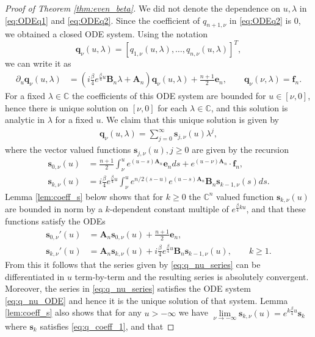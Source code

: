 \documentclass[10pt,a4paper]{amsart}
\newcommand{\CC}{{\mathbb C}}
\begin{document}
\begin{proof}[Proof of Theorem \ref{thm:even_beta}]
We did not denote the dependence on $u,\lambda$ in \eqref{eq:ODEq1} and \eqref{eq:ODEq2}. 
Since the coefficient 
of $q_{n+1,\nu}$ in \eqref{eq:ODEq2} is 0,   we obtained a closed ODE system.
Using the notation
\[
\mathbf{q}_{\nu}(u,\lambda)=[q_{1,\nu}(u,\lambda), \dots, q_{n,\nu}(u,\lambda)]^T,
\]
we can write it as 
\begin{align}\label{eq:q_nu_ODE}
     \partial_u \mathbf{q}_\nu(u,\lambda) &= (i \tfrac{\beta}{4}e^{\frac{\beta}{4}u} \mathbf{B}_n \lambda  +\mathbf{A}_n) \mathbf{q}_\nu(u,\lambda) +\frac{n+1}{2}\mathbf{e}_n, \qquad
     \mathbf{q}_{\nu}(\nu,\lambda) = \mathbf{f}_n.
\end{align}
For a fixed $\lambda\in \CC$ the coefficients of this ODE system are bounded for $u\in [\nu,0]$, hence there is unique solution on $[\nu,0]$ for each $\lambda\in \CC$, and this solution is analytic in $\lambda$ for a fixed $u$. We claim that this unique solution is given by 
\begin{align}
    \mathbf{q}_\nu(u,\lambda)=\sum_{j=0}^\infty \mathbf{s}_{j,\nu}(u)\lambda^j,\label{eq:q_nu_series}
\end{align}
where the vector valued functions $\mathbf{s}_{j,\nu}(u),j\ge 0$ are  given by the recursion  
\begin{align}\label{eq:s_nu_def1}
    \mathbf{s}_{0,\nu}(u) &=\frac{n+1}{2}\int_\nu^u e^{(u-s)\mathbf{A}_n} \mathbf{e}_nds+e^{(u-\nu) \mathbf{A}_n }\cdot \mathbf{f}_n,\\
    \mathbf{s}_{k,\nu}(u) &= i \frac{\beta}{4}e^{\frac{\beta}{4} u}\int_\nu^ue^{n/2 (s-u)}e^{(u-s)\mathbf{A}_n}\mathbf{B}_n \mathbf{s}_{k-1,\nu}(s)ds.\label{eq:s_nu_def2}
\end{align}
Lemma \ref{lem:coeff_s} below shows that for $k\ge 0$ the $\CC^n$ valued function $\mathbf{s}_{k,\nu}(u)$ are bounded in norm by a $k$-dependent constant multiple of $e^{\frac{\beta}{4} k u}$, and that these functions satisfy the ODEs
\begin{align}\label{eq:coeff_s_ode1}
     \mathbf{s}_{0,\nu}'(u)&= \mathbf{A}_n  \mathbf{s}_{0,\nu}(u)+ \frac{n+1}{2}\mathbf{e}_n,\\
        \mathbf{s}_{k,\nu}'(u)&= \mathbf{A}_n \mathbf{s}_{k,\nu}(u)+ i \tfrac{\beta}{4}e^{\frac{\beta}{4}u}\mathbf{B}_n \mathbf{s}_{k-1,\nu}(u), \qquad k\ge 1.\label{eq:coeff_s_ode2}
\end{align}
From this it follows that the series given by  \eqref{eq:q_nu_series} can be differentiated in $u$ term-by-term and the resulting series is absolutely convergent. Moreover, the series in \eqref{eq:q_nu_series} satisfies the ODE system \eqref{eq:q_nu_ODE} and hence it is the unique solution of that system.  Lemma \ref{lem:coeff_s} also shows that for any $u>-\infty$ we have $\lim\limits_{\nu\to -\infty} \mathbf{s}_{k,\nu}(u)=e^{k \frac{\beta}{4}u} \mathbf{s}_{k}$ where $\mathbf{s}_{k}$ satisfies \eqref{eq:q_coeff_1}, and that 

\end{proof}
\end{document}
